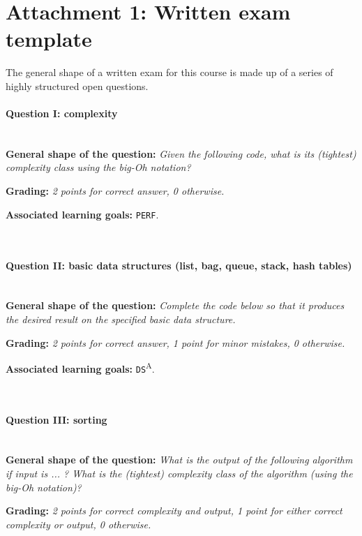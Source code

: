 \section*{Attachment 1: Written exam template}
The general shape of a written exam for this course is made up of a series of highly structured open questions.

\paragraph*{Question I: complexity} \ \\

\textbf{General shape of the question:} \textit{Given the following code, what is its (tightest) complexity class using the big-Oh notation?} \ 

\textbf{Grading:} \textit{2 points for correct answer, 0 otherwise.} \ 

\textbf{Associated learning goals:} \texttt{PERF}.

\ \\ 
\paragraph*{Question II: basic data structures (list, bag, queue, stack, hash tables)} \ \\

\textbf{General shape of the question:} \textit{Complete the code below so that it produces the desired result on the specified basic data structure.} \ 

\textbf{Grading:} \textit{2 points for correct answer, 1 point for minor mistakes, 0 otherwise.} \ 

\textbf{Associated learning goals:} \texttt{DS}\textsuperscript{A}.

\ \\ 
\paragraph*{Question III: sorting} \ \\

\textbf{General shape of the question:} \textit{What is the output of the following algorithm if input is ... ? What is the (tightest) complexity class of the algorithm (using the big-Oh notation)?} \ 

\textbf{Grading:} \textit{2 points for correct complexity and output, 1 point for either correct complexity or output, 0 otherwise.} \ 

